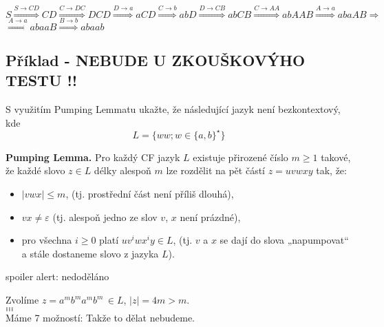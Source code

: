 $S \stackrel{S \rightarrow CD}{\Longrightarrow} CD \stackrel{C \rightarrow DC}{\Longrightarrow} DCD \stackrel
{D \rightarrow a}{\Longrightarrow} aCD \stackrel{C \rightarrow b}{\Longrightarrow} abD \stackrel{D \rightarrow CB}
{\Longrightarrow} abCB \stackrel{C \rightarrow AA}{\Longrightarrow} abAAB \stackrel{A \rightarrow a}{\Longrightarrow} 
abaAB \Longrightarrow $\\
$\stackrel{A \rightarrow a}{\Longrightarrow} abaaB \stackrel{B \rightarrow b}{\Longrightarrow} abaab$

\subsection{Příklad - NEBUDE U ZKOUŠKOVÝHO TESTU !!}

S využitím Pumping Lemmatu ukažte, že následující jazyk není bezkontextový, kde $$L = \{ww; w \in\{a,b\}^{\star}\}$$


\textbf{Pumping Lemma.} Pro každý CF jazyk $L$ existuje přirozené číslo $m \geq 1$ takové, že každé slovo $z \in L$ 
délky alespoň $m$ lze rozdělit na pět částí $z = uvwxy$ tak, že:

\begin{itemize}[label=\textbullet]
    \item $\lvert vwx \rvert \leq m$, (tj. prostřední část není příliš dlouhá),
    \item $vx \neq \varepsilon$ (tj. alespoň jedno ze slov $v$, $x$ není prázdné),
    \item pro všechna $i \geq 0$ platí $uv^i wx^i y \in L$, (tj. $v$ a $x$ se dají do slova „napumpovat“ a stále 
    dostaneme slovo z jazyka $L$).
\end{itemize}

spoiler alert: nedoděláno 

Zvolíme $z = a^m b^m a^m b^m \, \in L$, $|z| = 4m > m$. \\ 
$\dots$\\
$\dots$\\
$\dots$\\

Máme 7 možností: 
Takže to dělat nebudeme. 


